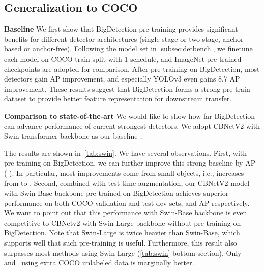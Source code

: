 \documentclass[10pt,twocolumn,letterpaper]{article}
\begin{document}
\subsection{Generalization to COCO}
\noindent \textbf{Baseline}
We first show that BigDetection pre-training provides significant benefits for different detector architectures (single-stage or two-stage, anchor-based or anchor-free).
Following the model set in \cref{subsec:detbench}, we finetune each model on COCO train split with 1 schedule, and ImageNet pre-trained checkpoints are adopted for comparison.
After pre-training on BigDetection, most detectors gain  AP improvement, and especially YOLOv3 even gains 8.7 AP improvement.
These results suggest that BigDetection forms a strong pre-train dataset to provide better feature representation for downstream transfer.

\noindent \textbf{Comparison to state-of-the-art}
We would like to show how far BigDetection can advance performance of current strongest detectors. We adopt CBNetV2 with Swin-transformer backbone as our baseline~\cite{liang2021cbnetv2}. 

The results are shown in~\cref{tab:swin}. We have several observations. 
First, with pre-training on BigDetection, we can further improve this strong baseline by  AP (  ). In particular, most improvements come from small objects, i.e.,  increases from  to . 
Second, combined with test-time augmentation, our CBNetV2 model with Swin-Base backbone pre-trained on BigDetection achieves superior performance on both COCO validation and test-dev sets,  and  AP respectively. We want to point out that this performance with Swin-Base backbone is even competitive to CBNetv2 with Swin-Large backbone without pre-training on BigDetection. Note that Swin-Large is twice heavier than Swin-Base, which supports well that such pre-training is useful.
Furthermore, this result also surpasses most methods using Swin-Large (\cref{tab:swin} bottom section).
Only~\cite{dai2021dynamic} and~\cite{xu2021end} using extra COCO unlabeled data is marginally better. 
\end{document}
